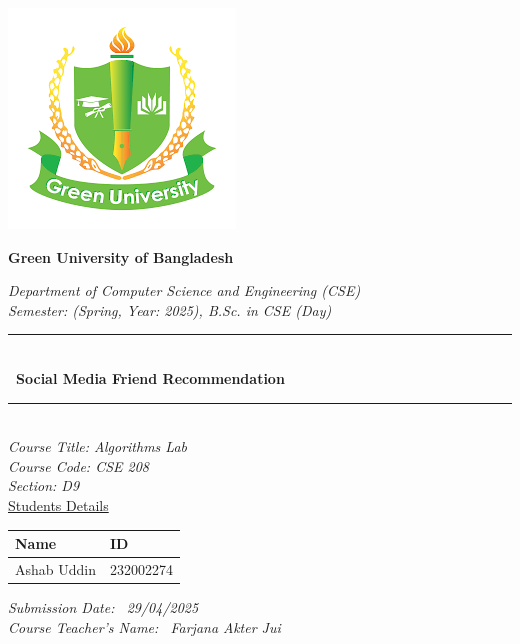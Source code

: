 \begin{titlepage}
\center 
\newcommand{\HRule}{\rule{\linewidth}{0.1mm}}
\includegraphics[scale=0.6]{Figures/GUB.png}\\[1cm] 
\center 
\begin{center}
    \textbf{\LARGE Green University of Bangladesh}
\end{center}

\textsl{\large Department of Computer Science and Engineering (CSE)}\\
\textsl{\large Semester: (Spring, Year: 2025), B.Sc. in CSE (Day)}\\[0.5cm] 
\makeatletter
\HRule \\[0.4cm]
{ \huge \bfseries \ Social Media Friend
Recommendation}\\[0.2cm] 
\HRule \\[1.0cm]

\textsl{\large Course Title: Algorithms Lab }\\
\textsl{\large Course Code: CSE 208 }\\ 
\textsl{\large Section: D9 }\\[0.5cm] 

{\large \underline{Students Details}}\\[0.2cm]

\begin{table}[htb]
\centering
\begin{tabular}{ |P{7.0cm}|P{3.5cm}|}
\hline
\textbf{Name} & \textbf{ID}\\
\hline
Ashab Uddin  & 232002274 \\
\hline
\end{tabular}
\end{table}
\vspace{0.5cm}


\textsl{\large Submission Date: \ 29/04/2025 }\\ 
\textsl{\large Course Teacher’s Name: \ Farjana Akter Jui }\\[0.9cm] 





\end{titlepage}
